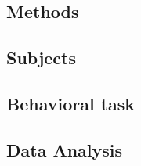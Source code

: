 \documentclass[9pt,biorxiv,lineno,onehalfspacing]{lapreprint}
\begin{document}
\begin{refsection}
\newpage
\section{Methods}
\subsection{Subjects}

\subsection{Behavioral task}

\subsection{Data Analysis}






\label{app:Indi_difficulty}


\label{app:IndDiffs}


%     

% 


\end{refsection}
\end{document}
